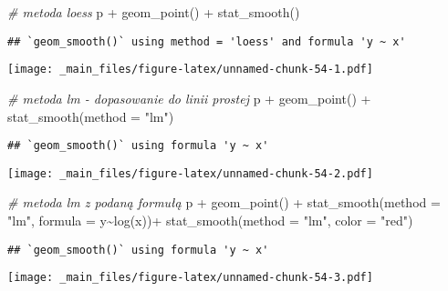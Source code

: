 \documentclass[
]{book}
\newenvironment{Shaded}{\begin{snugshade}}{\end{snugshade}}
\newcommand{\AttributeTok}[1]{\textcolor[rgb]{0.77,0.63,0.00}{#1}}
\newcommand{\CommentTok}[1]{\textcolor[rgb]{0.56,0.35,0.01}{\textit{#1}}}
\newcommand{\FunctionTok}[1]{\textcolor[rgb]{0.00,0.00,0.00}{#1}}
\newcommand{\NormalTok}[1]{#1}
\newcommand{\SpecialCharTok}[1]{\textcolor[rgb]{0.00,0.00,0.00}{#1}}
\newcommand{\StringTok}[1]{\textcolor[rgb]{0.31,0.60,0.02}{#1}}
\begin{document}
\begin{Shaded}
\begin{Highlighting}[]
\CommentTok{\# metoda loess}
\NormalTok{p }\SpecialCharTok{+} \FunctionTok{geom\_point}\NormalTok{() }\SpecialCharTok{+} \FunctionTok{stat\_smooth}\NormalTok{()}
\end{Highlighting}
\end{Shaded}

\begin{verbatim}
## `geom_smooth()` using method = 'loess' and formula 'y ~ x'
\end{verbatim}

\texttt{[image: \_main\_files/figure-latex/unnamed-chunk-54-1.pdf]}

\begin{Shaded}
\begin{Highlighting}[]
\CommentTok{\# metoda lm {-} dopasowanie do linii prostej}
\NormalTok{p }\SpecialCharTok{+} \FunctionTok{geom\_point}\NormalTok{() }\SpecialCharTok{+} \FunctionTok{stat\_smooth}\NormalTok{(}\AttributeTok{method =} \StringTok{"lm"}\NormalTok{)}
\end{Highlighting}
\end{Shaded}

\begin{verbatim}
## `geom_smooth()` using formula 'y ~ x'
\end{verbatim}

\texttt{[image: \_main\_files/figure-latex/unnamed-chunk-54-2.pdf]}

\begin{Shaded}
\begin{Highlighting}[]
\CommentTok{\# metoda lm z podaną formułą}
\NormalTok{p }\SpecialCharTok{+} \FunctionTok{geom\_point}\NormalTok{() }\SpecialCharTok{+} \FunctionTok{stat\_smooth}\NormalTok{(}\AttributeTok{method =} \StringTok{"lm"}\NormalTok{, }\AttributeTok{formula =}\NormalTok{ y}\SpecialCharTok{\textasciitilde{}}\FunctionTok{log}\NormalTok{(x))}\SpecialCharTok{+}
  \FunctionTok{stat\_smooth}\NormalTok{(}\AttributeTok{method =} \StringTok{"lm"}\NormalTok{, }\AttributeTok{color =} \StringTok{"red"}\NormalTok{)}
\end{Highlighting}
\end{Shaded}

\begin{verbatim}
## `geom_smooth()` using formula 'y ~ x'
\end{verbatim}

\texttt{[image: \_main\_files/figure-latex/unnamed-chunk-54-3.pdf]}
\end{document}
